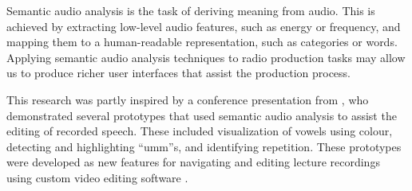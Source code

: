 


Semantic audio analysis is the task of deriving meaning from audio. This is achieved by extracting low-level audio
features, such as energy or frequency, and mapping them to a human-readable representation, such as categories or
words. Applying semantic audio analysis techniques to radio production tasks may allow us to produce richer user
interfaces that assist the production process.



This research was partly inspired by a conference presentation from \citet{Loviscach2013}, who demonstrated several
prototypes that used semantic audio analysis to assist the editing of recorded speech. These included visualization of
vowels using colour, detecting and highlighting ``umm''s, and identifying repetition. These prototypes were developed
as new features for navigating and editing lecture recordings using custom video editing software
\citep{Loviscach2011}.

